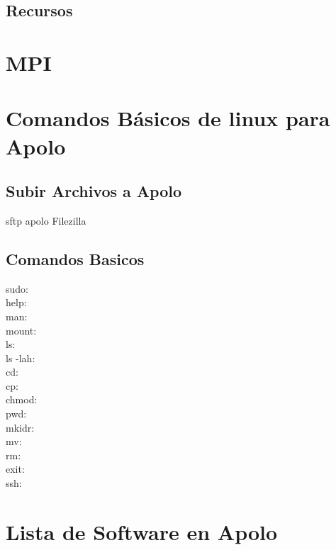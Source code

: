 
 \section{Recursos}

\chapter{MPI}



\chapter{Comandos Básicos de linux para Apolo}


\section{Subir Archivos a Apolo}

sftp apolo
Filezilla

\section{Comandos Basicos}

\begin{description}

\item[sudo:]
\item[help:]
\item[man:]
\item[mount:]
\item[ls:]
\item[ls -lah:]
\item[cd:]
\item[cp:]
\item[chmod:]
\item[pwd:]
\item[mkidr:]
\item[mv:]
\item[rm:]
\item[exit:]
\item[ssh:]

\end{description}


\chapter{Lista de Software en Apolo}
